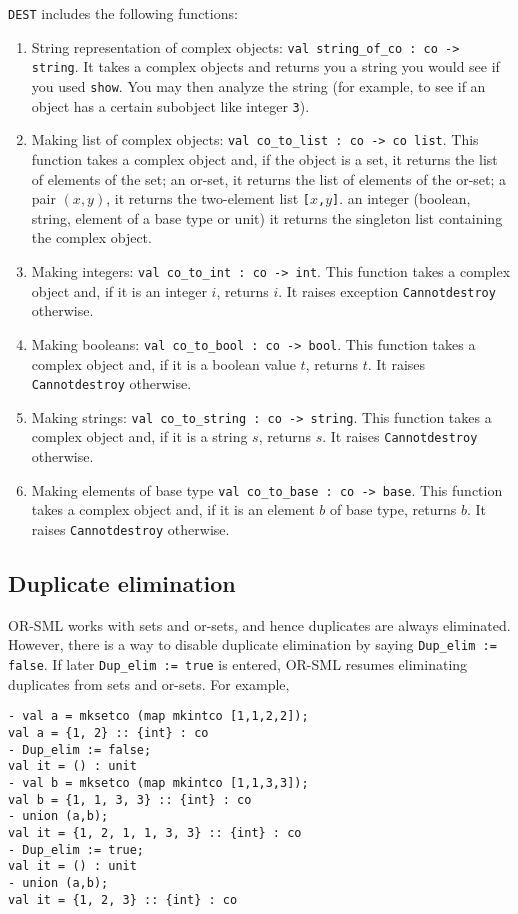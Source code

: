 {\tt DEST} includes the following
functions:
\begin{enumerate}
\item String representation of complex objects: {\tt val string\_of\_co
: co -> string}. It takes a complex objects and returns you a string
you would see if you used {\tt show}. You may then analyze the string
(for example, to see if an object has a certain subobject like integer
{\tt 3}). 
\item Making list of complex objects: 
{\tt val co\_to\_list : co -> co list}. This
function takes a complex object and, if the object is 
\subitem a set, it returns the list of elements of the set;
\subitem an or-set, it returns the list of elements of the or-set;
\subitem a pair $(x,y)$, it returns 
the two-element list {\tt [$x$,$y$]}. 
\subitem an integer (boolean, string, element of a base type or unit)
it returns the singleton list containing the complex
object.
\item Making integers: {\tt val co\_to\_int : co -> int}. This
function takes a complex object and, if it is an integer $i$, returns $i$.
It raises exception {\tt Cannotdestroy} otherwise.
\item Making booleans: {\tt val co\_to\_bool : co -> bool}. This
function takes a complex object and, if it is a boolean value $t$, returns $t$.
It raises  {\tt Cannotdestroy} otherwise.
\item Making strings: {\tt val co\_to\_string : co -> string}. This
function takes a complex object and, if it is a string $s$, returns $s$.
It raises  {\tt Cannotdestroy} otherwise.
\item Making elements of base type {\tt val co\_to\_base : co ->
base}. This
function takes a complex object and, if it is an element  $b$ of base
type, returns $b$. 
It raises  {\tt Cannotdestroy} otherwise.
\end{enumerate}


\subsection{Duplicate elimination}

OR-SML works with sets and or-sets, and hence duplicates are always
eliminated. However, there is a way to disable duplicate elimination
by saying {\tt Dup\_elim := false}. If later {\tt Dup\_elim := true}
is entered, OR-SML resumes eliminating duplicates from sets and
or-sets. For example,

{\small
\begin{verbatim}
- val a = mksetco (map mkintco [1,1,2,2]);
val a = {1, 2} :: {int} : co
- Dup_elim := false;
val it = () : unit
- val b = mksetco (map mkintco [1,1,3,3]);
val b = {1, 1, 3, 3} :: {int} : co
- union (a,b);
val it = {1, 2, 1, 1, 3, 3} :: {int} : co
- Dup_elim := true;
val it = () : unit
- union (a,b);
val it = {1, 2, 3} :: {int} : co
\end{verbatim}
}



